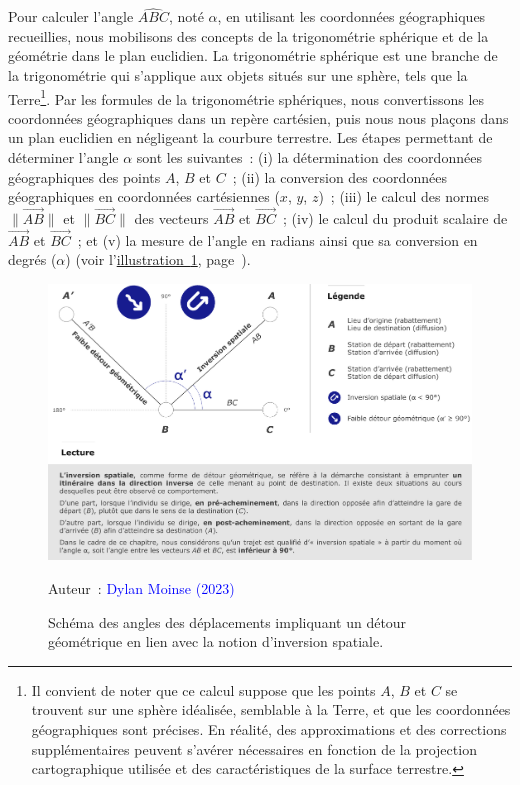 \begin{refsegment}
Pour calculer l'angle $\widehat{ABC}$, noté $\alpha$, en utilisant les coordonnées géographiques recueillies, nous mobilisons des concepts de la trigonométrie sphérique et de la géométrie dans le plan euclidien. La trigonométrie sphérique est une branche de la trigonométrie qui s'applique aux objets situés sur une sphère, tels que la Terre\footnote{
Il convient de noter que ce calcul suppose que les points \(A\), \(B\) et \(C\) se trouvent sur une sphère idéalisée, semblable à la Terre, et que les coordonnées géographiques sont précises. En réalité, des approximations et des corrections supplémentaires peuvent s'avérer nécessaires en fonction de la projection cartographique utilisée et des caractéristiques de la surface terrestre. 
}. Par les formules de la trigonométrie sphériques, nous convertissons les coordonnées géographiques dans un repère cartésien, puis nous nous plaçons dans un plan euclidien en négligeant la courbure terrestre. Les étapes permettant de déterminer l'angle $\alpha$ sont les suivantes~: (i) la détermination des coordonnées géographiques des points \(A\), \(B\) et \(C\)~; (ii) la conversion des coordonnées géographiques en coordonnées cartésiennes (\(x\), \(y\), \(z\))~; (iii) le calcul des normes $\lVert \vec{AB} \rVert$ et $\lVert \vec{BC} \rVert$ des vecteurs $\vec{AB}$ et $\vec{BC}$~; (iv) le calcul du produit scalaire de $\vec{AB}$ et $\vec{BC}$~; et (v) la mesure de l'angle en radians ainsi que sa conversion en degrés ($\alpha$) (voir l'\hyperref[fig-chap5:inversion-spatiale-detours]{illustration~\ref{fig-chap5:inversion-spatiale-detours}}, page~\pageref{fig-chap5:inversion-spatiale-detours}).%

    \begin{figure}[h!]\vspace*{4pt}
        \caption{Schéma des angles des déplacements impliquant un détour géométrique en lien avec la notion d'inversion spatiale.}
        \label{fig-chap5:inversion-spatiale-detours}
        \centerline{\includegraphics[width=1\columnwidth]{src/Figures/Chap-5/FR_Detours_Calcul_angles.pdf}}
        \vspace{5pt}
        \begin{flushright}\scriptsize{
        Auteur~: \textcolor{blue}{Dylan Moinse (2023)}
        }\end{flushright}
    \end{figure}


\end{refsegment}
